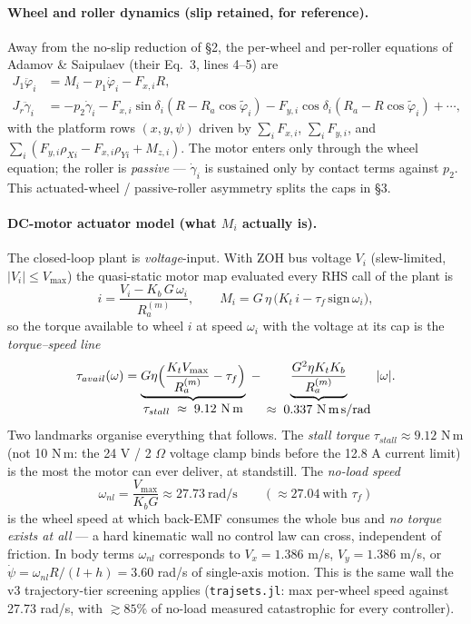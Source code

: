 \documentclass[11pt]{article}
\begin{document}
\paragraph{Wheel and roller dynamics (slip retained, for reference).} Away from the no-slip
reduction of \S2, the per-wheel and per-roller equations of Adamov \& Saipulaev (their Eq.\ 3,
lines 4--5) are
\begin{align}
J_1\ddot\varphi_i&=M_i-p_1\dot\varphi_i-F_{x,i}R,\\
J_r\ddot\gamma_i&=-p_2\dot\gamma_i-F_{x,i}\sin\delta_i\!\left(R-R_a\cos\tilde\varphi_i\right)
-F_{y,i}\cos\delta_i\!\left(R_a-R\cos\tilde\varphi_i\right)+\cdots,
\end{align}
with the platform rows $(x,y,\psi)$ driven by $\sum_i F_{x,i}$, $\sum_i F_{y,i}$, and
$\sum_i(F_{y,i}\rho_{Xi}-F_{x,i}\rho_{Yi}+M_{z,i})$. The motor enters only through the wheel
equation; the roller is \emph{passive} --- $\dot\gamma_i$ is sustained only by contact terms
against $p_2$. This actuated-wheel / passive-roller asymmetry splits the caps in \S3.

\paragraph{DC-motor actuator model (what $M_i$ actually is).} The closed-loop plant is
\emph{voltage}-input. With ZOH bus voltage $V_i$ (slew-limited, $|V_i|\le V_{\max}$) the
quasi-static motor map evaluated every RHS call of the plant is
\begin{equation}
i=\frac{V_i-K_b\,G\,\omega_i}{R_a^{(m)}},\qquad
M_i=G\,\eta\,\big(K_t\,i-\tau_f\,\mathrm{sign}\,\omega_i\big),
\label{eq:motormap}
\end{equation}
so the torque available to wheel $i$ at speed $\omega_i$ with the voltage at its cap is the
\emph{torque--speed line}
\begin{equation}
\tau_{avail}(\omega)=\underbrace{G\eta\Big(\frac{K_tV_{\max}}{R_a^{(m)}}-\tau_f\Big)}_{\displaystyle
\tau_{stall}\;\approx\;9.12\ \text{N\,m}}
\;-\;\underbrace{\frac{G^2\eta K_tK_b}{R_a^{(m)}}}_{\displaystyle
\approx\;0.337\ \text{N\,m\,s/rad}}\;|\omega|.
\label{eq:tauavail}
\end{equation}
Two landmarks organise everything that follows. The \emph{stall torque}
$\tau_{stall}\approx9.12$ N\,m (not 10 N\,m: the 24 V / 2 $\Omega$ voltage clamp binds before
the 12.8 A current limit) is the most the motor can ever deliver, at standstill. The
\emph{no-load speed}
\begin{equation}
\omega_{nl}=\frac{V_{\max}}{K_bG}\approx27.73\ \text{rad/s}
\qquad(\approx27.04\ \text{with }\tau_f)
\label{eq:noload}
\end{equation}
is the wheel speed at which back-EMF consumes the whole bus and \emph{no torque exists at
all} --- a hard kinematic wall no control law can cross, independent of friction. In body
terms $\omega_{nl}$ corresponds to $V_x=1.386$ m/s, $V_y=1.386$ m/s, or
$\dot\psi=\omega_{nl}R/(l+h)=3.60$ rad/s of single-axis motion. This is the same wall the
v3 trajectory-tier screening applies (\texttt{trajsets.jl}: max per-wheel speed against 27.73
rad/s, with $\gtrsim85\%$ of no-load measured catastrophic for every controller).
\end{document}

